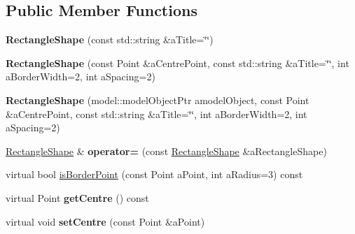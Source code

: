 \subsection*{Public Member Functions}
\begin{DoxyCompactItemize}
\item 
{\bfseries Rectangle\+Shape} (const std\+::string \&a\+Title=\char`\"{}\char`\"{})\hypertarget{class_view_1_1_rectangle_shape_a6fc6a32c159acc4ef318564996fa0965}{}\label{class_view_1_1_rectangle_shape_a6fc6a32c159acc4ef318564996fa0965}

\item 
{\bfseries Rectangle\+Shape} (const Point \&a\+Centre\+Point, const std\+::string \&a\+Title=\char`\"{}\char`\"{}, int a\+Border\+Width=2, int a\+Spacing=2)\hypertarget{class_view_1_1_rectangle_shape_a9625cfce67d2df4c22014467a3dbc0e0}{}\label{class_view_1_1_rectangle_shape_a9625cfce67d2df4c22014467a3dbc0e0}

\item 
{\bfseries Rectangle\+Shape} (model\+::\+model\+Object\+Ptr a\+model\+Object, const Point \&a\+Centre\+Point, const std\+::string \&a\+Title=\char`\"{}\char`\"{}, int a\+Border\+Width=2, int a\+Spacing=2)\hypertarget{class_view_1_1_rectangle_shape_a3203649d35ff84e9b5523d16832c757e}{}\label{class_view_1_1_rectangle_shape_a3203649d35ff84e9b5523d16832c757e}

\item 
\hyperlink{class_view_1_1_rectangle_shape}{Rectangle\+Shape} \& {\bfseries operator=} (const \hyperlink{class_view_1_1_rectangle_shape}{Rectangle\+Shape} \&a\+Rectangle\+Shape)\hypertarget{class_view_1_1_rectangle_shape_a7c1339a9ae1096201bfdc9b8a0802a48}{}\label{class_view_1_1_rectangle_shape_a7c1339a9ae1096201bfdc9b8a0802a48}

\item 
virtual bool \hyperlink{class_view_1_1_rectangle_shape_a69be3838db55e8557e6cb1e767ed0aab}{is\+Border\+Point} (const Point a\+Point, int a\+Radius=3) const 
\item 
virtual Point {\bfseries get\+Centre} () const \hypertarget{class_view_1_1_rectangle_shape_a075d237a4c4bad46346e9305fd9f60d7}{}\label{class_view_1_1_rectangle_shape_a075d237a4c4bad46346e9305fd9f60d7}

\item 
virtual void {\bfseries set\+Centre} (const Point \&a\+Point)\hypertarget{class_view_1_1_rectangle_shape_a905817abb1294f0e83f1ecdb065cc994}{}\label{class_view_1_1_rectangle_shape_a905817abb1294f0e83f1ecdb065cc994}


\end{DoxyCompactItemize}
